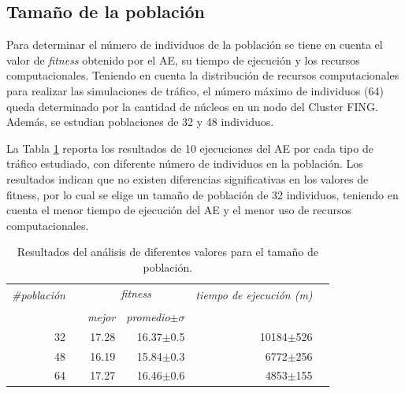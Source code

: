 \subsection{Tamaño de la población}

Para determinar el número de individuos de la población se tiene en cuenta el valor de \emph{fitness} obtenido por el AE, su tiempo de ejecución y los recursos computacionales. Teniendo en cuenta la distribución de recursos computacionales para realizar las simulaciones de tráfico, el número máximo de individuos (64) queda determinado por la cantidad de núcleos en un nodo del Cluster FING. Además, se estudian poblaciones de 32 y 48 individuos.

La Tabla \ref{table:parametro_poblacion} reporta los resultados de 10 ejecuciones del AE por cada tipo de tráfico estudiado, con diferente número de individuos en la población. Los resultados indican que no existen diferencias significativas en los valores de fitness, por lo cual se elige un tamaño de población de 32 individuos, teniendo en cuenta el menor tiempo de ejecución del AE y el menor uso de recursos computacionales.

\begin{table}[!ht]
	\renewcommand{\arraystretch}{1.0}
\renewcommand{\tabcolsep}{8pt}
	\caption{Resultados del análisis de diferentes valores para el tamaño de población.}
	\label{table:parametro_poblacion}
	\centering
	\begin{tabular}{rrrrrp{2cm}}
		\toprule
		\multirow{2}{*}{\textit{\#población}}& &
		\multicolumn{2}{c}{\textit{fitness}} & \multirow{2}{*}{\textit{tiempo de ejecución (m)}} \\
		\cline{3-4} \\[-9pt]
		& & \textit{mejor}
		& \textit{promedio$\pm \sigma$}
		\\
		\midrule
		32 & & {17.28} & 16.37$\pm$0.5 & 10184$\pm$526\\
		48 & & {16.19} & 15.84$\pm$0.3 & 6772$\pm$256\\
		64 & & {17.27} & 16.46$\pm$0.6 & 4853$\pm$155\\
		\bottomrule
	\end{tabular}
\end{table}

